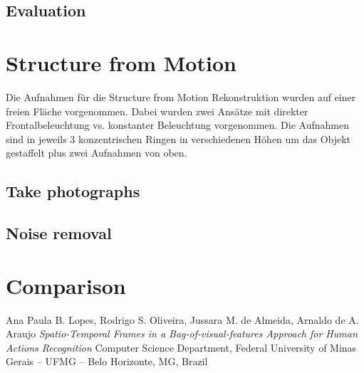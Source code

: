 \documentclass[]{article}
\begin{document}
\subsection{Evaluation}


\section{Structure from Motion}

Die Aufnahmen für die Structure from Motion Rekonstruktion wurden auf einer freien Fläche vorgenommen. Dabei wurden zwei Ansätze mit direkter Frontalbeleuchtung vs. konstanter Beleuchtung vorgenommen.
Die Aufnahmen sind in jeweils 3 konzentrischen Ringen in verschiedenen Höhen um das Objekt gestaffelt plus zwei Aufnahmen von oben.

\subsection{Take photographs}

\subsection{Noise removal}


\section{Comparison}




\begin{thebibliography}{1}

   Ana Paula B. Lopes, Rodrigo S. Oliveira, Jussara M. de Almeida, Arnaldo de A. Araujo {\em Spatio-Temporal Frames in a Bag-of-visual-features Approach for Human Actions Recognition} Computer Science Department, Federal University of Minas Gerais – UFMG – Belo Horizonte, MG, Brazil
\end{thebibliography}        

		
\end{document}
